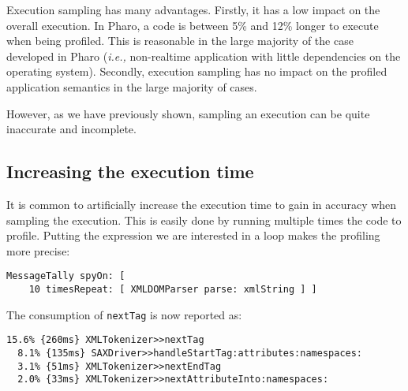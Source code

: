 \documentclass{sig-alternate}
\newcommand{\ct}{\lstinline[backgroundcolor=\color{white},basicstyle=\footnotesize\ttfamily]}
\newcommand{\ie}{\emph{i.e.,}\xspace}
\begin{document}
Execution sampling has many advantages. Firstly, it has a low impact on the overall execution. In Pharo, a code is between 5\% and 12\% longer to execute when being profiled. This is reasonable in the large majority of the case developed in Pharo (\ie non-realtime application with little dependencies on the operating system). 
Secondly, execution sampling has no impact on the profiled application semantics in the large majority of cases. %


However, as we have previously shown, sampling an execution can be quite inaccurate and incomplete. 

\subsection{Increasing the execution time}


It is common to artificially increase the execution time to gain in accuracy when sampling the execution. This is easily done by running multiple times the code to profile. Putting the expression we are interested in a loop makes the profiling more precise:

\begin{lstlisting}
MessageTally spyOn: [  
	10 timesRepeat: [ XMLDOMParser parse: xmlString ] ]
\end{lstlisting}

The consumption of \ct{nextTag} is now reported as:

\begin{lstlisting}
15.6% {260ms} XMLTokenizer>>nextTag
  8.1% {135ms} SAXDriver>>handleStartTag:attributes:namespaces:
  3.1% {51ms} XMLTokenizer>>nextEndTag
  2.0% {33ms} XMLTokenizer>>nextAttributeInto:namespaces:
\end{lstlisting}
\end{document}
